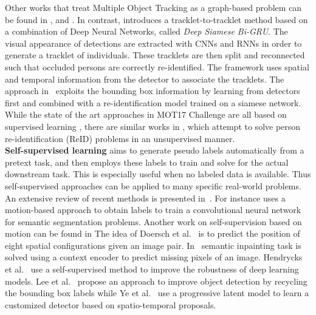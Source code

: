 Other works that treat Multiple Object Tracking as a graph-based problem can be found in \cite{henschel2017improvements}, \cite{keuper2015efficient,keuper2016multi,kumar2014multiple} and \cite{zamir2012gmcp}.
In contrast, \cite{ma2018trajectory} introduces a tracklet-to-tracklet method based on a combination of Deep Neural Networks, called \textit{Deep Siamese Bi-GRU}. 
The visual appearance of detections are extracted with CNNs and RNNs in order to generate a tracklet of individuals.
These tracklets are then split and reconnected such that occluded persons are correctly re-identified. 
The framework uses spatial and temporal information from the detector to associate the tracklets. 
The approach in~\cite{bergmann2019tracking} exploits the bounding box information by learning from detectors first and combined with a re-identification model trained on a siamese network. 
While the state of the art approaches in MOT17 Challenge are all based on supervised learning \cite{henschel2018fusion, kim2015multiple, 8533372, chen2017enhancing}, there are similar works in \cite{li2018unsupervised, lv2018unsupervised}, which attempt to solve person re-identification (ReID) problems in an unsupervised manner.\\

\noindent\textbf{Self-supervised learning} aims to generate pseudo labels automatically from a pretext task, and then employs these labels to train and solve for the actual downstream task. 
This is especially useful when no labeled data is available. Thus self-supervised approaches can be applied to many specific real-world problems. An extensive review of recent methods is presented in~\cite{jing2019self}. 
For instance \cite{pathak2017learning} uses a motion-based approach to obtain labels to train a convolutional neural network for semantic segmentation problems.
Another work on self-supervision based on motion can be found in \cite{mahendran2018cross}
The idea of Doersch et al.~\cite{doersch2015unsupervised} is to predict the position of eight spatial configurations given an image pair.
In~\cite{pathak2016context} semantic inpainting task is solved using a context encoder to predict missing pixels of an image.
Hendrycks et al.~\cite{hendrycks2019using} use a self-supervised method to improve the robustness of deep learning models.
Lee et al.~\cite{lee2019multi} propose an approach to improve object detection by recycling the
bounding box labels while Ye et al.~\cite{ye2017self} use a progressive latent model to learn a customized detector based on spatio-temporal proposals.